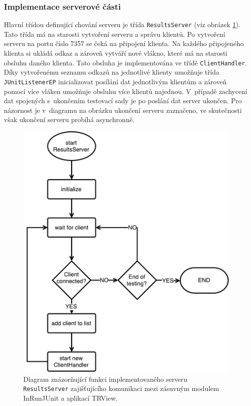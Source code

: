       \subsubsection{Implementace serverové části}
	Hlavní třídou definující chování serveru je třída \texttt{ResultsServer} (viz obrázek \ref{fig:resultsserver_flowchart}). Tato třída má na starosti vytvoření serveru a správu klientů. Po vytvoření serveru na portu číslo 7357 se čeká na připojení klienta. Na každého připojeného klienta si ukládá odkaz a zároveň vytváří nové vlákno, které má na starosti obsluhu daného klienta. Tato obsluha je implementována ve třídě \texttt{ClientHandler}. Díky vytvořenému seznamu odkazů na jednotlivé klienty umožňuje třída \texttt{JUnitListenerEP} inicializovat posílání dat jednotlivým klientům a zároveň pomocí více vláken umožňuje obsluhu více klientů najednou. V~případě zachycení dat spojených s~ukončením testovací sady je po poslání dat server ukončen. Pro názornost je v~diagramu na obrázku ukončení serveru zaznačeno, ve skutečnosti však ukončení serveru probíhá asynchronně.
	
	\begin{figure}
	  \includegraphics[width=\textwidth, height=0.5\textheight, keepaspectratio, center]{obrazky-figures/inrunjunit_resultsserver_flowchart.pdf}
	  \caption{Diagram znázorňující funkci implementovaného serveru \texttt{ResultsServer} zajišťujícího komunikaci mezi zásuvným modulem InRunJUnit a aplikací TRView.}
	  \label{fig:resultsserver_flowchart}
	\end{figure}

